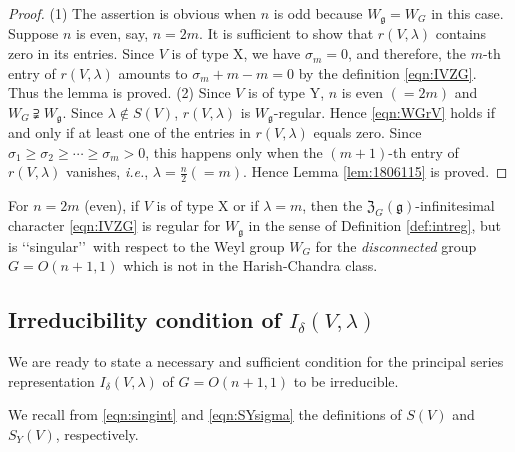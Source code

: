 \begin{proof}
(1)\enspace 
The assertion is obvious
 when $n$ is odd
 because $W_{\mathfrak{g}}=W_G$
 in this case.  
Suppose $n$ is even, 
say, 
 $n=2m$.  
It is sufficient to show
 that $r(V,\lambda)$ contains zero
 in its entries.  
Since $V$ is of type X, 
 we have $\sigma_m=0$, 
 and therefore, 
 the $m$-th entry of $r(V,\lambda)$ amounts to 
 $\sigma_m + m-m=0$ by the definition \eqref{eqn:IVZG}.  
Thus the lemma is proved.  
\newline
(2)\enspace
Since $V$ is of type Y, 
 $n$ is even $(=2m)$ and $W_G \supsetneqq W_{\mathfrak{g}}$.  
Since $\lambda \not \in S(V)$, 
 $r(V,\lambda)$ is $W_{\mathfrak{g}}$-regular.  
Hence \eqref{eqn:WGrV} holds
 if and only if at least one of the entries in $r(V,\lambda)$ equals zero.  
Since $\sigma_1 \ge \sigma_2 \ge \cdots \ge \sigma_m >0$, 
 this happens only when the $(m+1)$-th entry
 of $r(V,\lambda)$ vanishes, 
 {\it{i.e.}}, $\lambda = \frac n 2 (=m)$.  
Hence Lemma \ref{lem:1806115} is proved.  
\end{proof}



\begin{remark}
\label{rem:zeroreg}
For $n=2m$ (even), 
 if $V$ is of type X
 or if $\lambda=m$, 
 then the ${\mathfrak {Z}}_G({\mathfrak{g}})$-infinitesimal character
 \eqref{eqn:IVZG} is regular 
 for 
 $W_{\mathfrak{g}}$
 in the sense of Definition \ref{def:intreg}, 
 but is 
\lq\lq{singular}\rq\rq\
 with respect to the Weyl group 
 $W_G$
 for the {\it{disconnected}} group 
 $G=O(n+1,1)$
 which is not in the Harish-Chandra class.  
\end{remark}







\subsection{Irreducibility condition of $I_{\delta}(V,\lambda)$}
\label{subsec:180595}
We are ready to state a necessary and sufficient condition
 for the principal series representation $I_{\delta}(V,\lambda)$
 of $G=O(n+1,1)$
 to be irreducible.  

We recall from \eqref{eqn:singint} and \eqref{eqn:SYsigma}
 the definitions of 
$S(V)$ and 
$S_Y(V)$, 
 respectively.  

